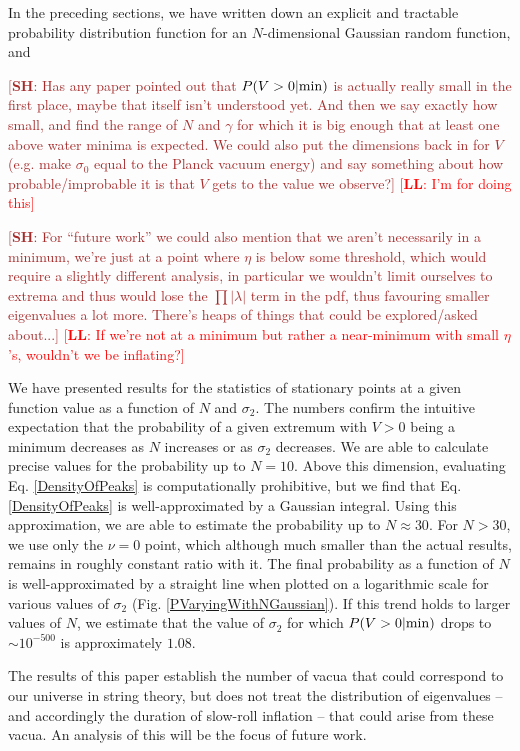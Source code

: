 \documentclass[12pt]{article}
\newcommand{\lfl}[1]{\textcolor{red}{[{\bf LL}: #1]}}
\newcommand{\SH}[1]{\textcolor{brown}{[{\bf SH}: #1]}}
\begin{document}
In the preceding sections, we have  written down an explicit and tractable probability distribution function for an $N$-dimensional  Gaussian random function, and 

\SH{Has any paper pointed out that $P(V>0|{\rm min})$ is actually really small in the first place, maybe that itself isn't understood yet. And then we say exactly how small, and find the range of $N$ and $\gamma$ for which it is big enough that at least one above water minima is expected. We could also put the dimensions back in for $V$ (e.g. make $\sigma_0$ equal to the Planck vacuum energy)  and say something about how probable/improbable it is that $V$ gets to the value we observe?} \lfl{I'm for doing this}

\SH{For ``future work'' we could also mention that we aren't necessarily in a minimum, we're just at a point where $\eta$ is below some threshold, which would require a slightly different analysis, in particular we wouldn't limit ourselves to extrema and thus would lose the $\prod |\lambda|$ term in the pdf, thus favouring smaller eigenvalues a lot more. There's heaps of things that could be explored/asked about...} \lfl{If we're not at a minimum but rather a near-minimum with small $\eta$'s, wouldn't we be inflating?}


We have presented results for the statistics of stationary points at a given function value as a function of $N$ and $\sigma_2$. The numbers confirm the intuitive expectation that the probability of a given extremum with $V > 0$ being a minimum decreases as $N$ increases or as $\sigma_2$ decreases. We are able to calculate precise values for the probability up to $N=10$. Above this dimension, evaluating Eq. \ref{DensityOfPeaks} is computationally prohibitive, but we find that Eq. \ref{DensityOfPeaks} is well-approximated by a Gaussian integral. Using this approximation, we are able to estimate the probability up to $N \approx 30$. For $N>30$, we use only the $\nu=0$ point, which although much smaller than the actual results, remains in roughly constant ratio with it. The final probability as a function of $N$ is well-approximated by a straight line when plotted on a logarithmic scale for various values of $\sigma_2$ (Fig. \ref{PVaryingWithNGaussian}). If this trend holds to larger values of $N$, we estimate that the value of $\sigma_2$ for which $P(V>0|{\rm min})$ drops to $\sim 10^{-500}$ is approximately $1.08$.

The results of this paper establish the number of vacua that could correspond to our universe in string theory, but does not treat the distribution of eigenvalues -- and accordingly the duration of slow-roll inflation -- that could arise from these vacua. An analysis of this will be the focus of future work.
\end{document}
